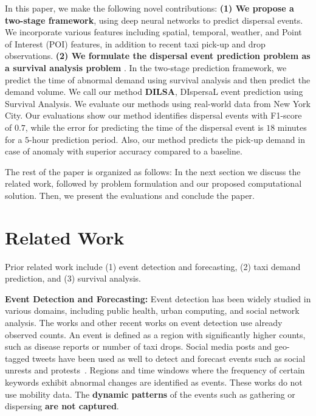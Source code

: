 \documentclass[letterpaper]{article} %
\begin{document}
In this paper, we make the following novel contributions: \textbf{(1) We propose a two-stage framework}, using deep neural networks to predict dispersal events. We incorporate various features including spatial, temporal, weather, and Point of Interest (POI) features, in addition to recent taxi pick-up and drop observations. %
\textbf{(2) We formulate the dispersal event prediction problem as a survival analysis problem} \cite{miller2011survival}.%
In the two-stage prediction framework, we predict the time of abnormal demand using survival analysis and then predict the demand volume. We call our method \textbf{DILSA}, DIspersaL event prediction using Survival Analysis. We evaluate our methods using real-world data from New York City. Our evaluations show our method identifies dispersal events with F1-score of $0.7$, while the error for predicting the time of the dispersal event is $18$ minutes for a $5$-hour prediction period. Also, our method predicts the pick-up demand in case of anomaly with superior accuracy compared to a baseline.

The rest of the paper is organized as follows: In the next section we discuss the related work, followed by problem formulation and our proposed computational solution. Then, we present the evaluations and conclude the paper.



\section{Related Work}
\label{related_work}
Prior related work include (1) event detection and forecasting, (2) taxi demand prediction, and (3) survival analysis. 

\textbf{Event Detection and Forecasting:} Event detection has been widely studied in various domains, including public health, urban computing, and social network analysis. The works \cite{kulldorff1997spatial,kulldorff2005space,neill2009expectation} and other recent works on event detection \cite{li2012mining,hong2015detecting} use already observed counts. An event is defined as a region with significantly higher counts, such as disease reports or number of taxi drops. Social media posts and geo-tagged tweets have been used as well to detect and forecast events such as social unrests and protests~\cite{zhou2014event,chen2014non,liu2016graph,zhang2017triovecevent}. Regions and time windows where the frequency of certain keywords exhibit abnormal changes are identified as events. These works do not use mobility data. The \textbf{dynamic patterns} of the events such as gathering or dispersing \textbf{are not captured}.
\end{document}
